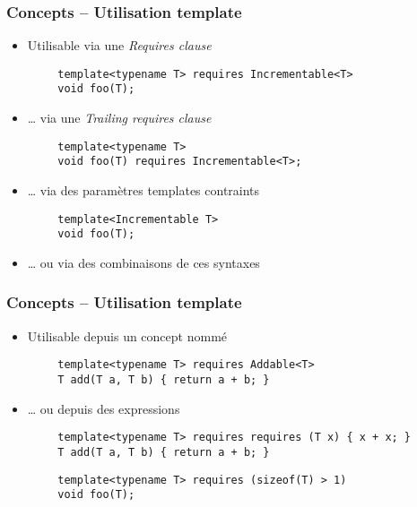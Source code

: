\documentclass[C++.tex]{subfiles}
\begin{document}
\begin{frame}[fragile]
	\frametitle{Concepts -- Utilisation template}
	\begin{itemize}
		\item Utilisable via une \textit{Requires clause}
	\end{itemize}

	\begin{verbatim}
		template<typename T> requires Incrementable<T>
		void foo(T);
	\end{verbatim}

	\begin{itemize}
		\item \ldots{} via une \textit{Trailing requires clause}
	\end{itemize}

	\begin{verbatim}
		template<typename T>
		void foo(T) requires Incrementable<T>;
	\end{verbatim}

	\begin{itemize}
		\item \ldots{} via des paramètres templates contraints
	\end{itemize}

	\begin{verbatim}
		template<Incrementable T>
		void foo(T);
	\end{verbatim}

	\begin{itemize}
		\item \ldots{} ou via des combinaisons de ces syntaxes
	\end{itemize}
\end{frame}

\begin{frame}[fragile]
	\frametitle{Concepts -- Utilisation template}
	\begin{itemize}
		\item Utilisable depuis un concept nommé
	\end{itemize}

	\begin{verbatim}
		template<typename T> requires Addable<T>
		T add(T a, T b) { return a + b; }
	\end{verbatim}

	\begin{itemize}
		\item \ldots{} ou depuis des expressions
	\end{itemize}

	\begin{verbatim}
		template<typename T> requires requires (T x) { x + x; }
		T add(T a, T b) { return a + b; }
	\end{verbatim}

	\begin{verbatim}
		template<typename T> requires (sizeof(T) > 1)
		void foo(T);
	\end{verbatim}

\end{frame}
\end{document}
